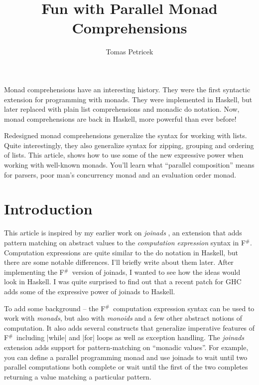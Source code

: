 \documentclass{tmr}
\title{Fun with Parallel Monad Comprehensions}
\author{Tomas Petricek\email{tomas.petricek@cl.cam.ac.uk}}
\begin{document}
\newcommand{\fsharp}[0]{F$^\#$}
\newcommand{\ident}[1]{{\normalfont\sffamily #1}}


\begin{introduction} 
Monad comprehensions have an interesting history. They were the first syntactic extension for 
programming with monads. They were implemented in Haskell, but later replaced with plain list
comprehensions and monadic do notation. Now, monad comprehensions are back in Haskell,
more powerful than ever before!

Redesigned monad comprehensions generalize the syntax for working with lists. Quite interestingly, 
they also generalize syntax for zipping, grouping and ordering of lists. This article, shows how to 
use some of the new expressive power when working with well-known monads. You'll learn what 
``parallel composition'' means for parsers, poor man's concurrency monad and an evaluation 
order monad.
\end{introduction}


\section{Introduction}

This article is inspired by my earlier work on \textit{joinads} \cite{joinads}, an extension that 
adds pattern matching on abstract values to the \textit{computation expression} syntax in \fsharp. 
Computation expressions are quite similar to the do notation in Haskell, but there are some notable 
differences. I'll briefly write about them later. After implementing the \fsharp \ version of 
joinads, I wanted to see how the ideas would look in Haskell. I was quite surprised to find out that 
a recent patch for GHC adds some of the expressive power of joinads to Haskell. 

To add some background -- the \fsharp \ computation expression syntax can be used to work with 
\textit{monads}, but also with \textit{monoids} and a few other abstract notions of computation. 
It also adds several constructs that generalize imperative features of \fsharp \ including |while| 
and |for| loops as well as exception handling. The \textit{joinads} extension adds support for
pattern-matching on ``monadic values''. For example, you can define a parallel programming monad
and use joinads to wait until two parallel computations both complete or wait until the first of 
the two completes returning a value matching a particular pattern.
\end{document}
